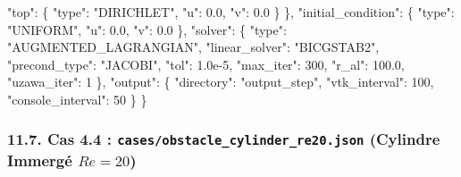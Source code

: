 \documentclass[
  french,
]{article}
\newenvironment{Shaded}{}{}
\newcommand{\DataTypeTok}[1]{\textcolor[rgb]{0.56,0.13,0.00}{#1}}
\newcommand{\DecValTok}[1]{\textcolor[rgb]{0.25,0.63,0.44}{#1}}
\newcommand{\FloatTok}[1]{\textcolor[rgb]{0.25,0.63,0.44}{#1}}
\newcommand{\FunctionTok}[1]{\textcolor[rgb]{0.02,0.16,0.49}{#1}}
\newcommand{\StringTok}[1]{\textcolor[rgb]{0.25,0.44,0.63}{#1}}
\begin{document}
\begin{Shaded}
\begin{Highlighting}[]
    \DataTypeTok{"top"}\FunctionTok{:}    \FunctionTok{\{} \DataTypeTok{"type"}\FunctionTok{:} \StringTok{"DIRICHLET"}\FunctionTok{,} \DataTypeTok{"u"}\FunctionTok{:} \FloatTok{0.0}\FunctionTok{,} \DataTypeTok{"v"}\FunctionTok{:} \FloatTok{0.0} \FunctionTok{\}}
  \FunctionTok{\},}
  \DataTypeTok{"initial\_condition"}\FunctionTok{:} \FunctionTok{\{} \DataTypeTok{"type"}\FunctionTok{:} \StringTok{"UNIFORM"}\FunctionTok{,} \DataTypeTok{"u"}\FunctionTok{:} \FloatTok{0.0}\FunctionTok{,} \DataTypeTok{"v"}\FunctionTok{:} \FloatTok{0.0} \FunctionTok{\},}
  \DataTypeTok{"solver"}\FunctionTok{:} \FunctionTok{\{}
    \DataTypeTok{"type"}\FunctionTok{:} \StringTok{"AUGMENTED\_LAGRANGIAN"}\FunctionTok{,}
    \DataTypeTok{"linear\_solver"}\FunctionTok{:} \StringTok{"BICGSTAB2"}\FunctionTok{,}
    \DataTypeTok{"precond\_type"}\FunctionTok{:} \StringTok{"JACOBI"}\FunctionTok{,}
    \DataTypeTok{"tol"}\FunctionTok{:} \FloatTok{1.0e{-}5}\FunctionTok{,} \DataTypeTok{"max\_iter"}\FunctionTok{:} \DecValTok{300}\FunctionTok{,} \DataTypeTok{"r\_al"}\FunctionTok{:} \FloatTok{100.0}\FunctionTok{,} \DataTypeTok{"uzawa\_iter"}\FunctionTok{:} \DecValTok{1}
  \FunctionTok{\},}
  \DataTypeTok{"output"}\FunctionTok{:} \FunctionTok{\{} \DataTypeTok{"directory"}\FunctionTok{:} \StringTok{"output\_step"}\FunctionTok{,} \DataTypeTok{"vtk\_interval"}\FunctionTok{:} \DecValTok{100}\FunctionTok{,} \DataTypeTok{"console\_interval"}\FunctionTok{:} \DecValTok{50} \FunctionTok{\}}
\FunctionTok{\}}
\end{Highlighting}
\end{Shaded}

\subsubsection{\texorpdfstring{11.7. Cas 4.4 :
\texttt{cases/obstacle\_cylinder\_re20.json} (Cylindre Immergé
\(Re=20\))}{11.7. Cas 4.4 : cases/obstacle\_cylinder\_re20.json (Cylindre Immergé Re=20)}}\label{cas-4.4-casesobstacle_cylinder_re20.json-cylindre-immerguxe9-re20}
\end{document}
